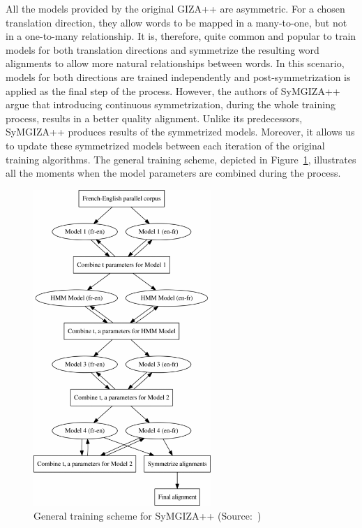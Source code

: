 All the models provided by the original GIZA++ are asymmetric. For a chosen translation direction, they allow words to be mapped in a many-to-one, but not in a one-to-many relationship. It is, therefore, quite common and popular to train models for both translation directions and symmetrize the resulting word alignments to allow more natural relationships between words. In this scenario, models for both directions are trained independently and post-symmetrization is applied as the final step of the process. However, the authors of SyMGIZA++ argue that introducing continuous symmetrization, during the whole training process, results in a better quality alignment. Unlike its predecessors, SyMGIZA++ produces results of the symmetrized models. Moreover, it allows us to update these symmetrized models between each iteration of the original training algorithms. The general training scheme,  depicted in Figure~\ref{figure:symgiza}, illustrates all the moments when the model parameters are combined during the process.

\begin{figure}[!htb]
	\centering
	\caption{General training scheme for SyMGIZA++ (Source:~\cite{Junczys10})}
	\label{figure:symgiza}
	\vspace{1em}
	\includegraphics[width=0.6\textwidth]{images/symgiza.png}
\end{figure}


